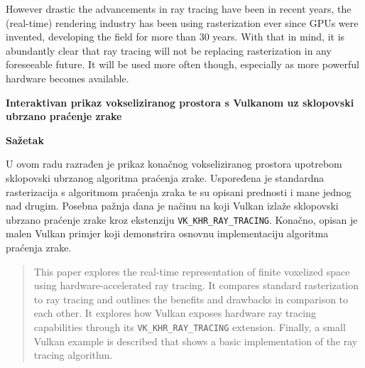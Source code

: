 \documentclass[times, utf8, zavrsni, numeric]{fer}
\begin{document}
However drastic the advancements in ray tracing have been in recent years, the (real-time) rendering industry has been using rasterization ever since GPUs were invented, developing the field for more than 30 years. With that in mind, it is abundantly clear that ray tracing will not be replacing rasterization in any foreseeable future. It will be used more often though, especially as more powerful hardware becomes available.




\newpage
\vspace*{\fill}
\thispagestyle{empty}
\begin{center}
{\bf Interaktivan prikaz vokseliziranog prostora s Vulkanom uz sklopovski ubrzano praćenje zrake}
\end{center}
\hspace*{\fill} {\bf Sa\v{z}etak} \hspace*{\fill} \par
\vspace*{25pt}

U ovom radu razrađen je prikaz konačnog vokseliziranog prostora upotrebom \linebreak sklopovski ubrzanog algoritma praćenja zrake. Uspoređena je standardna rasterizacija s algoritmom praćenja zraka te su opisani prednosti i mane jednog nad drugim. Posebna pažnja dana je načinu na koji Vulkan izlaže sklopovski ubrzano praćenje zrake kroz ekstenziju \texttt{VK\_KHR\_RAY\_TRACING}. Konačno, opisan je malen Vulkan primjer koji demonstrira osnovnu implementaciju algoritma praćenja zrake.


\begin{abstract}
This paper explores the real-time representation of finite voxelized space using hardware-accelerated ray tracing. It compares standard rasterization to ray tracing and outlines the benefits and drawbacks in comparison to each other. It explores how Vulkan exposes hardware ray tracing capabilities through its \texttt{VK\_KHR\_RAY\_TRACING} extension. Finally, a small Vulkan example is described that shows a basic implementation of the ray tracing algorithm.

\end{abstract}
\end{document}
